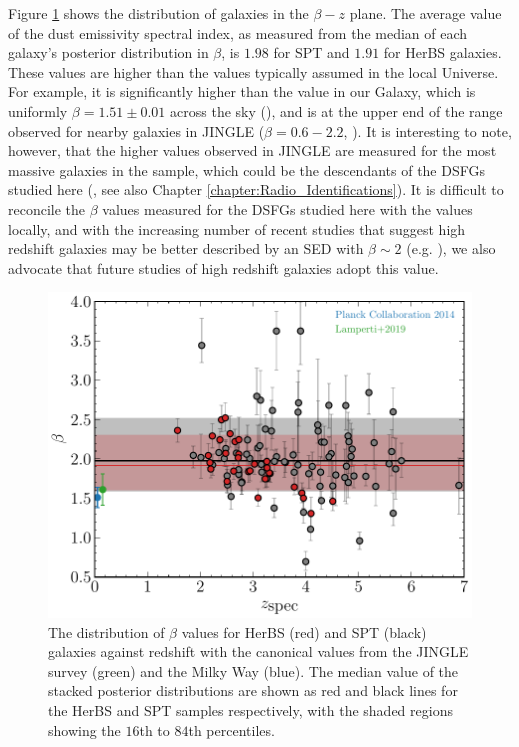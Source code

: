 Figure \ref{fig:beta_z_evolution} shows the distribution of galaxies in the $\beta-z$ plane. The average value of the dust emissivity spectral index, as measured from the median of each galaxy's posterior distribution in $\beta$, is $1.98$ for SPT and $1.91$ for HerBS galaxies. These values are higher than the values typically assumed in the local Universe. For example, it is significantly higher than the value in our Galaxy, which is uniformly $\beta = 1.51\pm0.01$ across the sky (\citealt{Planck_Collaboration_2015}), and is at the upper end of the range observed for nearby galaxies in JINGLE ($\beta = 0.6 - 2.2$, \citealt{Lamperti_2019}). It is interesting to note, however, that the higher values observed in JINGLE are measured for the most massive galaxies in the sample, which could be the descendants of the DSFGs studied here (\citealt{Eales_2023}, see also Chapter \ref{chapter:Radio_Identifications}). It is difficult to reconcile the $\beta$ values measured for the DSFGs studied here with the values locally, and with the increasing number of recent studies that suggest high redshift galaxies may be better described by an SED with $\beta \sim 2$ (e.g. \citealt{daCunha_2021, Witstok_2023}), we also advocate that future studies of high redshift galaxies adopt this value.

\begin{figure}
	\centering
	\includegraphics[width=0.8\columnwidth]{Figures/beta_evolution.pdf}
	\caption[Distribution of HerBS and SPT galaxies in the $\beta$ - redshift plane]{The distribution of $\beta$ values for HerBS (red) and SPT (black) galaxies against redshift with the canonical values from the JINGLE survey (green) and the Milky Way (blue). The median value of the stacked posterior distributions are shown as red and black lines for the HerBS and SPT samples respectively, with the shaded regions showing the $16$th to $84$th percentiles.}
	\label{fig:beta_z_evolution}
\end{figure}

